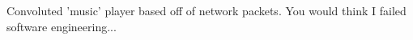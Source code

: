 Convoluted 'music' player based off of network packets. You would think I failed software engineering... 